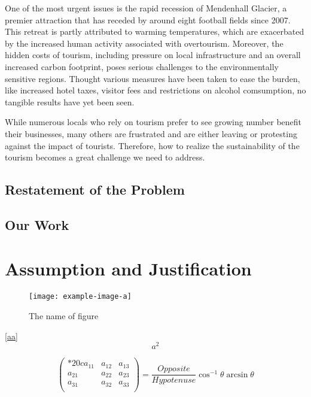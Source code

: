 \documentclass{mcmthesis}
\begin{document}
One of the most urgent issues is the rapid recession of Mendenhall 
Glacier, a premier attraction that has receded by around eight football
fields since 2007. This retreat is partly attributed to warming 
temperatures, which are exacerbated by the increased human activity 
associated with overtourism. Moreover, the hidden costs of tourism,
including pressure on local infrastructure and an overall increased 
carbon footprint, poses serious challenges to the environmentally 
sensitive regions. Thought various measures have been taken to ease
the burden, like increased hotel taxes, visitor fees and restrictions 
on alcohol comsumption, no tangible results have yet been seen.

While numerous locals who rely on tourism prefer to see growing number
benefit their businesses, many others are frustrated and are either leaving
or protesting against the impact of tourists. Therefore, how to realize
the sustainability of the tourism becomes a great challenge we need to address.
\subsection{Restatement of the Problem}


\subsection{Our Work}


\section{Assumption and Justification}
\begin{figure}[h]
\small
\centering
\texttt{[image: example-image-a]}
\caption{The name of figure} \label{fig:aa}
\end{figure}

\lipsum[8] \eqref{aa}
\begin{equation}
a^2 \label{aa}
\end{equation}

\[
  \begin{pmatrix}{*{20}c}
  {a_{11} } & {a_{12} } & {a_{13} }  \\
  {a_{21} } & {a_{22} } & {a_{23} }  \\
  {a_{31} } & {a_{32} } & {a_{33} }  \\
  \end{pmatrix}
  = \frac{{Opposite}}{{Hypotenuse}}\cos ^{ - 1} \theta \arcsin \theta
\]
\lipsum[9]
\end{document}
